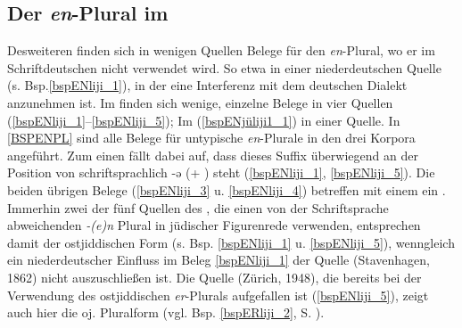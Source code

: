 \subsection{Der \textit{en}-Plural im }\label{enPLURAL}
Desweiteren finden sich in wenigen Quellen Belege für den \textit{en}-Plural, wo er im Schriftdeutschen nicht verwendet wird. So etwa in einer niederdeutschen Quelle (s. Bsp.\ref{bspENliji_1}), in der eine Interferenz mit dem deutschen Dialekt anzunehmen ist. Im  finden sich wenige, einzelne Belege in vier Quellen (\ref{bspENliji_1}–\ref{bspENliji_5}); Im  (\ref{bspENjüliji1_1}) in einer Quelle. In \ref{BSPENPL} sind alle Belege für untypische \textit{en}-Plurale in den drei Korpora angeführt. Zum einen fällt dabei auf, dass dieses Suffix überwiegend an der Position von schriftsprachlich -ə (+ ) steht (\ref{bspENliji_1}, \ref{bspENliji_5}). Die beiden übrigen Belege (\ref{bspENliji_3} u. \ref{bspENliji_4}) betreffen mit einem  ein . Immerhin zwei der fünf Quellen des , die einen von der Schriftsprache abweichenden \textit{-(e)n} Plural in jüdischer Figurenrede verwenden, entsprechen damit der ostjiddischen Form (s. Bsp. \ref{bspENliji_1} u. \ref{bspENliji_5}), wenngleich ein niederdeutscher Einfluss im Beleg \ref{bspENliji_1} der Quelle  (Stavenhagen, 1862) nicht auszuschließen ist. Die Quelle  (Zürich, 1948), die bereits bei der Verwendung des ostjiddischen \textit{er}-Plurals aufgefallen ist (\ref{bspENliji_5}), zeigt auch hier die  oj. Pluralform (vgl. Bsp. \ref{bspERliji_2}, S. \pageref{bspERliji_2}).\\ 



